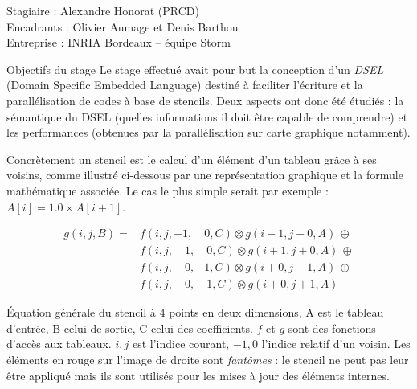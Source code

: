 \documentclass[a4paper,10pt]{article}
\newcommand{\intern}{Alexandre Honorat (PRCD)}
\newcommand{\tutor}{Olivier Aumage et Denis Barthou}
\newcommand{\companyname}{INRIA Bordeaux -- équipe Storm}
\begin{document}
\begin{center}

\vspace{0.2cm}

  {\large Stagiaire : \intern}\\
  {\large Encadrants : \tutor}\\
  {\large Entreprise : \companyname}

\vspace{0.25cm}

\begin{bclogo}[couleur=black!10,couleurBord=black!50,arrondi=0.1,logo=\hspace{17pt},barre=none]{Objectifs du stage}
Le stage effectué avait pour but la conception d'un \emph{DSEL} (Domain Specific Embedded Language) destiné à faciliter l'écriture et la parallélisation de codes à base de stencils. Deux aspects ont donc été étudiés : la sémantique du DSEL (quelles informations il doit être capable de comprendre) et les performances (obtenues par la parallélisation sur carte graphique notamment).

Concrètement un stencil est le calcul d'un élément d'un tableau grâce à ses voisins, comme illustré ci-dessous par une représentation graphique et la formule mathématique associée. Le cas le plus simple serait par exemple : $A[i] = 1.0 \times A[i+1]$.

\begin{minipage}[c]{0.6\textwidth}
\begin{equation*}
\begin{aligned}
g(i,j,B) = & f(i, j, -1, \quad 0, C) \otimes g(i-1, j+0, A) \, \oplus \\
           & f(i, j, \quad 1, \quad 0, C) \otimes g(i+1,j+0, A) \, \oplus \\
           & f(i, j, \quad 0, -1, C) \otimes g(i+0,j-1, A) \, \oplus \\ 
           & f(i, j, \quad 0, \quad 1, C) \otimes g(i+0,j+1, A)
\end{aligned}
\end{equation*}
\end{minipage}%
\begin{minipage}[c]{.3\textwidth}

\end{minipage}%

Équation générale du stencil à $4$ points en deux dimensions, A est le tableau d'entrée, B celui de sortie, C celui des coefficients. $f$ et $g$ sont des fonctions d'accès aux tableaux. $i,j$ est l'indice courant, $-1,0$ l'indice relatif d'un voisin. Les éléments en rouge sur l'image de droite sont \emph{fantômes} : le stencil ne peut pas leur être appliqué mais ils sont utilisés pour les mises à jour des éléments internes.


\end{bclogo}
\end{center}
\end{document}
